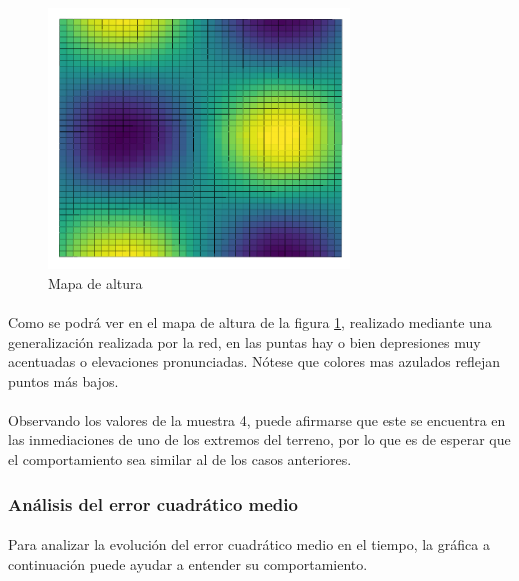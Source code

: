 \documentclass[12pt, twocolumn]{article}
\begin{document}
	\begin{figure}[H]
		\centering
		\includegraphics[width=8cm]{../results/heightmap.png}
		\caption{Mapa de altura}
		\label{heightmap}
	\end{figure}
	
	\paragraph{} Como se podrá ver en el mapa de altura de la figura \ref{heightmap}, realizado mediante una generalización realizada por la red, en las puntas hay o bien depresiones muy acentuadas o elevaciones pronunciadas. Nótese que colores mas azulados reflejan puntos más bajos. 
	
	\paragraph{} Observando los valores de la muestra 4, puede afirmarse que este se encuentra en las inmediaciones de uno de los extremos del terreno, por lo que es de esperar que el comportamiento sea similar al de los casos anteriores.
	
	\subsubsection{Análisis del error cuadrático medio}
	
	\paragraph{} Para analizar la evolución del error cuadrático medio en el tiempo, la gráfica a continuación puede ayudar a entender su comportamiento. 
	
\end{document}
